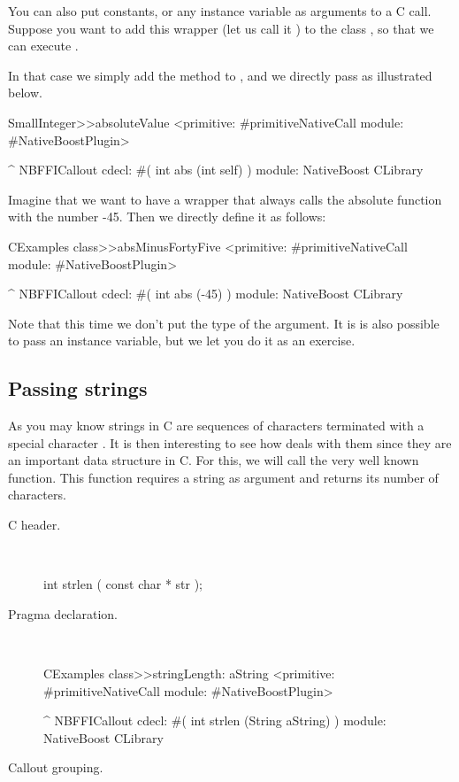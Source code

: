 \documentclass[a4paper,10pt,twoside]{book}
\begin{document}
You can also put constants,  or any instance variable as arguments to a C call. Suppose you want to add this  wrapper (let us call it ) to the class , so that we can execute .

In that case we simply add the  method to , and we directly pass  as illustrated below.

\begin{code}{}
SmallInteger>>absoluteValue
	<primitive: #primitiveNativeCall module: #NativeBoostPlugin>
	
	^ NBFFICallout cdecl: #( int abs (int self) ) module: NativeBoost CLibrary
\end{code}

Imagine that we want to have a wrapper that always calls the absolute function with the number -45. Then we directly define it as follows:

\begin{code}{}
CExamples class>>absMinusFortyFive
	<primitive: #primitiveNativeCall module: #NativeBoostPlugin>
	
	^ NBFFICallout cdecl: #( int abs (-45) ) module: NativeBoost CLibrary
\end{code}

Note that this time we don't put the type of the argument. It is is also possible to pass an instance variable, but we let you do it as an exercise.

\subsection{Passing strings}
As you may know strings in C are sequences of characters terminated with a special character \ct{\0}. It is then interesting to see how \Spock deals with them since they are an important data structure in C. For this, we will call the very well known  function. This function requires a string as argument and returns its
number of characters. 


\begin{description}
\item [C header.] \ 

\begin{code}{}
int strlen ( const char * str );
\end{code}

\item [Pragma declaration.] \ 

\begin{code}{}
CExamples class>>stringLength: aString
	<primitive: #primitiveNativeCall module: #NativeBoostPlugin>
	
	^ NBFFICallout cdecl: #( int strlen (String aString) ) module: NativeBoost CLibrary
\end{code}


\item [Callout grouping.] \ 
 
\end{description}
\end{document}

